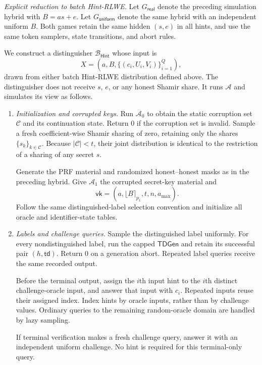 \documentclass[lettersize,journal]{IEEEtran}
\begin{document}
	\emph{Explicit reduction to batch Hint-RLWE.}
	Let $G_{\mathsf{real}}$ denote the preceding simulation hybrid
	with $B=as+e$.
	Let $G_{\mathsf{uniform}}$ denote the same hybrid with an
	independent uniform $B$.
	Both games retain the same hidden $(s,e)$ in all hints,
	and use the same token samplers, state transitions, and abort rules.
	
	We construct a distinguisher $\mathcal B_{\mathsf{Hint}}$ whose input is
	\[
	X=\left(a,B,\{(c_i,U_i,V_i)\}_{i=1}^{Q}\right),
	\]
	drawn from either batch Hint-RLWE distribution defined above.
	The distinguisher does not receive $s$, $e$, or any honest
	Shamir share.
	It runs $\mathcal A$ and simulates its view as follows.
	
	\begin{enumerate}
		\item \emph{Initialization and corrupted keys.}
		Run $\mathcal A_0$ to obtain the static corruption set
		$\mathcal C$ and its continuation state.
		Return $0$ if the corruption set is invalid.
		Sample a fresh coefficient-wise Shamir sharing of zero,
		retaining only the shares $\{s_k\}_{k\in\mathcal C}$.
		Because $|\mathcal C|<t$, their joint distribution is identical
		to the restriction of a sharing of any secret $s$.
		
		Generate the PRF material and randomized honest--honest masks
		as in the preceding hybrid.
		Give $\mathcal A_1$ the corrupted secret-key material and
		\[
		\mathsf{vk}=(a,\lfloor B\rceil_{p_1},t,n,a_{\max}).
		\]
		Follow the same distinguished-label selection convention
		and initialize all oracle and identifier-state tables.
		
		\item \emph{Labels and challenge queries.}
		Sample the distinguished label uniformly.
		For every nondistinguished label, run the capped
		$\mathsf{TDGen}$ and retain its successful pair
		$(h,\mathsf{td})$.
		Return $0$ on a generation abort.
		Repeated label queries receive the same recorded output.
		
		Before the terminal output, assign the $i$th input hint
		to the $i$th distinct challenge-oracle input,
		and answer that input with $c_i$.
		Repeated inputs reuse their assigned index.
		Index hints by oracle inputs, rather than by challenge values.
		Ordinary queries to the remaining random-oracle domain
		are handled by lazy sampling.
		
		If terminal verification makes a fresh challenge query,
		answer it with an independent uniform challenge.
		No hint is required for this terminal-only query.
		

\end{enumerate}
\end{document}
